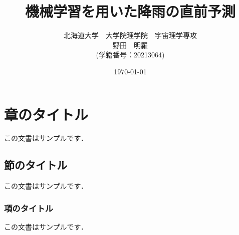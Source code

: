 \documentclass[titlepage]{jarticle}
\title{機械学習を用いた降雨の直前予測}
\author{北海道大学　大学院理学院　宇宙理学専攻\\野田　明羅\\(学籍番号：20213064)}
\date{\today}
\begin{document}

\maketitle

\begin{abstract}

\end{abstract}

\section{章のタイトル}
この文書はサンプルです．

\subsection{節のタイトル}
この文書はサンプルです．

\subsubsection{項のタイトル}
この文書はサンプルです．




\end{document}
